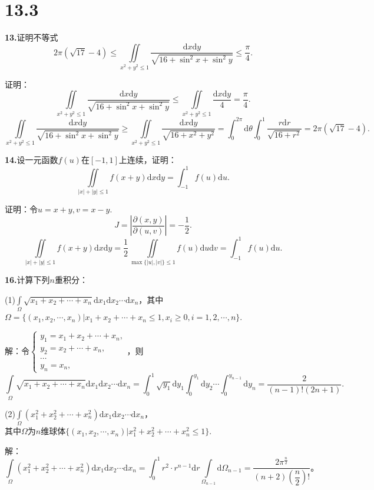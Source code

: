 \documentclass[12pt, a4paper]{article}
\newcommand{\dif}{\mathrm{d}}
\begin{document}
\section*{13.3}
\textbf{13.}证明不等式
\[2\pi(\sqrt{17} - 4) \leq \iint\limits_{x^2 + y^2 \leq 1} \frac{\dif x \dif y}{\sqrt{16 + \sin^2 x + \sin^2 y}} \leq \frac{\pi}{4}.\]

证明：
\[\iint\limits_{x^2 + y^2 \leq 1} \frac{\dif x \dif y}{\sqrt{16 + \sin^2 x + \sin^2 y}} \leq \iint\limits_{x^2 + y^2 \leq 1} \frac{\dif x \dif y}{4} = \frac{\pi}{4}.\]
\[\iint\limits_{x^2 + y^2 \leq 1} \frac{\dif x \dif y}{\sqrt{16 + \sin^2 x + \sin^2 y}} \geq \iint\limits_{x^2 + y^2 \leq 1} \frac{\dif x \dif y}{\sqrt{16 + x^2 + y^2}} = \int_{0}^{2\pi} \dif \theta \int_0^1 \frac{r\dif r}{\sqrt{16 + r^2}} = 2\pi(\sqrt{17} - 4).\]

\textbf{14.}设一元函数\(f(u)\)在\([-1, 1]\)上连续，证明：
\[\iint\limits_{|x| + |y| \leq 1} f(x + y) \dif x \dif y = \int_{-1}^{1} f(u) \dif u.\]

证明：令\(u = x + y, v = x - y\).
\[J = \left|\frac{\partial(x, y)}{\partial(u, v)}\right| = -\frac{1}{2}.\]
\[\iint\limits_{|x| + |y| \leq 1} f(x + y) \dif x \dif y = \frac{1}{2} \iint\limits_{\max\{|u|, |v|\} \leq 1} f(u) \dif u \dif v = \int_{-1}^{1} f(u) \dif u.\]

\textbf{16.}计算下列\(n\)重积分：

(1)\(\int\limits_\Omega \sqrt{x_1 + x_2 + \cdots + x_n} \dif x_1 \dif x_2 \cdots \dif x_n\)，其中\\
\(\Omega = \{(x_1, x_2, \cdots, x_n)|x_1 + x_2 + \cdots + x_n \leq 1, x_i \geq 0, i = 1, 2, \cdots, n\}\).

解：令\(\begin{cases}
y_1 = x_1 + x_2 + \cdots + x_n, \\
y_2 = x_2  + \cdots + x_n, \\
\cdots \\
y_n = x_n,
\end{cases}\)，则
\[\int\limits_\Omega \sqrt{x_1 + x_2 + \cdots + x_n} \dif x_1 \dif x_2 \cdots \dif x_n = \int_0^1 \sqrt{y_1} \dif y_1 \int_{0}^{y_1} \dif y_2 \cdots \int_{0}^{y_{n - 1}} \dif y_n = \frac{2}{(n - 1)!(2n + 1)}.\]

(2)\(\int\limits_\Omega (x_1^2 + x_2^2 + \cdots + x_n^2) \dif x_1 \dif x_2 \cdots \dif x_n\)，\\
其中\(\Omega\)为\(n\)维球体\(\{(x_1, x_2, \cdots, x_n)|x_1^2 + x_2^2 + \cdots + x_n^2 \leq 1\}\).

解：
\[\int\limits_\Omega (x_1^2 + x_2^2 + \cdots + x_n^2) \dif x_1 \dif x_2 \cdots \dif x_n = \int_0^1 r^2 \cdot r^{n - 1} \dif r \int\limits_{\Omega_{n - 1}} \dif \Omega_{n - 1} = \frac{2\pi^{\frac{n}{2}}}{(n + 2)\left(\dfrac{n}{2}\right)!}。\]
\end{document}
